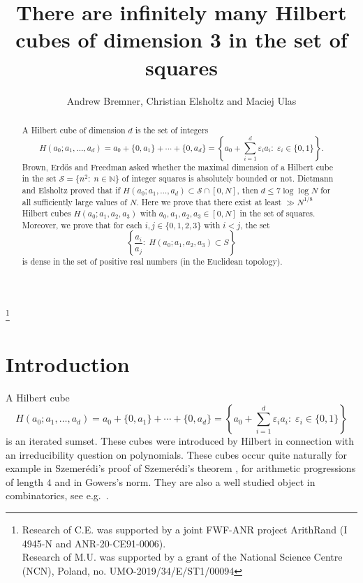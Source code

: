 \documentclass[10pt]{amsart}
\theoremstyle{plain}
\def\cal{\mathcal}
\begin{document}
\title[Hilbert cubes of dimension 3 in the set of squares]{There are infinitely many Hilbert cubes of dimension 3 in the set of squares}

\author{Andrew Bremner, Christian Elsholtz and Maciej Ulas}

\thanks{
Research of C.E. was supported by a joint FWF-ANR project ArithRand (I 4945-N and ANR-20-CE91-0006).\\
Research of M.U. was supported by a grant of the National Science Centre (NCN), Poland, no. UMO-2019/34/E/ST1/00094}



\begin{abstract}
A Hilbert cube of dimension $d$ is the set of integers 
\[
H(a_{0}; a_{1}, \ldots, a_{d})=a_{0}+\{0, a_{1}\}+\cdots+\{0, a_{d}\}=\left\{a_{0}+\sum_{i=1}^{d}\varepsilon_{i}a_{i}:\;\varepsilon_{i}\in\{0,1\}\right\}.
\]
Brown, Erd\H{o}s and Freedman asked whether the maximal dimension of a Hilbert cube in the set $\cal{S}=\{n^2:\;n\in\mathbb{N}\}$ of integer squares is absolutely bounded or not. Dietmann and Elsholtz proved that if $H(a_{0}; a_{1}, \ldots, a_{d})\subset \cal{S}\cap [0, N]$, then $d\leq 7 \log\log N$ for all sufficiently large values of $N$. Here we prove that there exist at least $\gg N^{1/8}$ Hilbert cubes 
$H(a_{0}; a_{1}, a_{2}, a_{3})$ with $a_{0}, a_{1}, a_{2}, a_{3}\in [0,N]$ in the set of squares.
Moreover, we prove that for each $i, j\in\{0, 1, 2, 3\}$ with $i<j$, the set
$$
\left\{\frac{a_{i}}{a_{j}}:\;H(a_{0}; a_{1}, a_{2}, a_{3})\subset S\right\}
$$
is dense in the set of positive real numbers (in the Euclidean topology).
\end{abstract}
\maketitle
\section{Introduction}\label{sec1}



A Hilbert cube 
\[H(a_0;a_1, \ldots, a_d)=a_0+ \{0,a_1\}+ \cdots + \{0,a_d\}
=\left\{a_{0}+\sum_{i=1}^{d}\varepsilon_{i}a_{i}:\;\varepsilon_{i}\in\{0,1\}\right\}
\]
is an iterated sumset. These cubes were introduced by Hilbert \cite{Hilbert:1892} in connection with an irreducibility question on polynomials.
These cubes occur quite naturally for example in Szemer\'{e}di's proof of
Szemer\'{e}di's theorem \cite{Szemeredi:1969}, for arithmetic progressions of length $4$ and in Gowers's norm.
They are also a well studied object in combinatorics, see e.g.~\cite{Conlon-Fox-Sudakov:2014, Hegyvari:1999, Solymosi:2007}.
\end{document}

